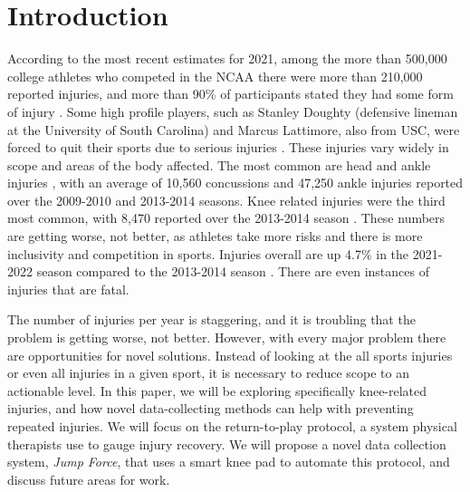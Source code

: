 \documentclass[manuscript,screen,review]{acmart}
\begin{document}


\maketitle

\section{Introduction} \label{sec:introduction}

According to the most recent estimates for 2021, among the more than 500,000 college athletes who competed in the NCAA there were more than 210,000 reported injuries, and more than 90\% of participants stated they had some form of injury \cite{dart_2021}. Some high profile players, such as Stanley Doughty (defensive lineman at the University of South Carolina) and Marcus Lattimore, also from USC, were forced to quit their sports due to serious injuries \cite{dart_2021}. These injuries vary widely in scope and areas of the body affected. The most common are head and ankle injuries \cite{Caplan2014}, with an average of 10,560 concussions \cite{doi:10.1177/0363546515599634} and 47,250 ankle injuries \cite{Tummala2018-gv} reported over the 2009-2010 and 2013-2014 seasons. Knee related injuries were the third most common, with 8,470 reported over the 2013-2014 season \cite{doi:10.1177/0363546515599634, Arendt1995-ze}. These numbers are getting worse, not better, as athletes take more risks and there is more inclusivity and competition in sports. Injuries overall are up 4.7\% in the 2021-2022 season compared to the 2013-2014 season \cite{dart_2021, doi:10.1177/0363546515599634}. There are even instances of injuries that are fatal.

The number of injuries per year is staggering, and it is troubling that the problem is getting worse, not better. However, with every major problem there are opportunities for novel solutions. Instead of looking at the all sports injuries or even all injuries in a given sport, it is necessary to reduce scope to an actionable level. In this paper, we will be exploring specifically knee-related injuries, and how novel data-collecting methods can help with preventing repeated injuries. We will focus on the return-to-play protocol, a system physical therapists use to gauge injury recovery. We will propose a novel data collection system, \textit{Jump Force}, that uses a smart knee pad to automate this protocol, and discuss future areas for work.
\end{document}
